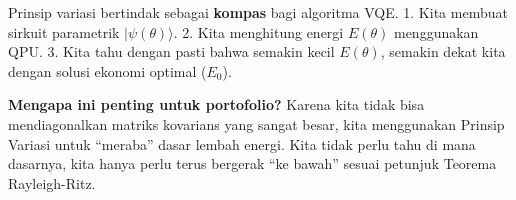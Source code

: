 Prinsip variasi bertindak sebagai \textbf{kompas} bagi algoritma VQE. 1. Kita membuat sirkuit parametrik \(|\psi(\theta)\rangle\). 2. Kita menghitung energi \(E(\theta)\) menggunakan QPU. 3. Kita tahu dengan pasti bahwa semakin kecil \(E(\theta)\), semakin dekat kita dengan solusi ekonomi optimal (\(E_0\)).

\textbf{Mengapa ini penting untuk portofolio?} Karena kita tidak bisa mendiagonalkan matriks kovarians yang sangat besar, kita menggunakan Prinsip Variasi untuk ``meraba'' dasar lembah energi. Kita tidak perlu tahu di mana dasarnya, kita hanya perlu terus bergerak ``ke bawah'' sesuai petunjuk Teorema Rayleigh-Ritz.
